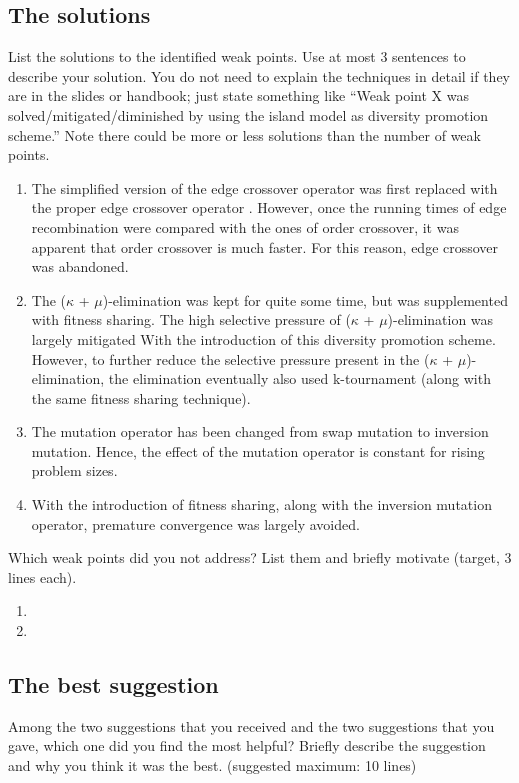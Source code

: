 \documentclass[a4paper,10pt]{article}
\newcommand{\ReplaceMe}[1]{{\color{blue}#1}}
\begin{document}
\subsection{The solutions}
\ReplaceMe{List the solutions to the identified weak points. Use at most 3 sentences to describe your solution. You do not need to explain the techniques in detail if they are in the slides or handbook; just state something like ``Weak point X was solved/mitigated/diminished by using the island model as diversity promotion scheme.'' Note there could be more or less solutions than the number of weak points.}

\begin{enumerate}
 \item The simplified version of the edge crossover operator was first replaced with the proper edge crossover operator \cite{eiben_smith}. However, once the running times of edge recombination were compared with the ones of order crossover, it was apparent that order crossover is much faster. For this reason, edge crossover was abandoned.
 \item The ($\kappa$ + $\mu$)-elimination was kept for quite some time, but was supplemented with fitness sharing. The high selective pressure of ($\kappa$ + $\mu$)-elimination was largely mitigated With the introduction of this diversity promotion scheme. However, to further reduce the selective pressure present in the ($\kappa$ + $\mu$)-elimination, the elimination eventually also used k-tournament (along with the same fitness sharing technique).
 \item The mutation operator has been changed from swap mutation to inversion mutation. Hence, the effect of the mutation operator is constant for rising problem sizes.
 \item With the introduction of fitness sharing, along with the inversion mutation operator, premature convergence was largely avoided.
\end{enumerate}

\ReplaceMe{Which weak points did you not address? List them and briefly motivate (target, 3 lines each).}

\begin{enumerate} %
 \item 
 \item 
\end{enumerate}

\subsection{The best suggestion}
\ReplaceMe{Among the two suggestions that you received and the two suggestions that you gave, which one did you find the most helpful? Briefly describe the suggestion and why you think it was the best. (suggested maximum: 10 lines)}
\end{document}
